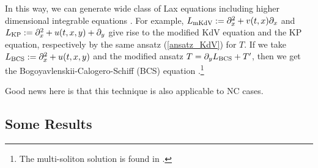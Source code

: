 \documentclass[a4paper,12pt]{article}\setlength{\topmargin}{-1cm}
\begin{document}
In this way, we can generate wide class of Lax equations 
including higher dimensional integrable equations \cite{ToYu}.
For example, $L_{\scriptsize\mbox{mKdV}}:=\partial_x^2+v(t,x)\partial_x$ and 
$L_{\scriptsize\mbox{KP}}:=\partial_x^2+u(t,x,y)+\partial_y$ give rise to 
the modified KdV equation and the KP equation, respectively 
by the same ansatz (\ref{ansatz_KdV}) for $T$.
If we take $L_{\scriptsize\mbox{BCS}}:=\partial_x^2+u(t,x,y)$ and 
the modified ansatz $T=\partial_y L_{\scriptsize\mbox{BCS}}+T^\prime$,
then we get the Bogoyavlenskii-Calogero-Schiff (BCS) 
equation \cite{BoSc}.\footnote{The multi-soliton solution 
is found in \cite{YTSF}.}

Good news here is that this technique is also applicable to
NC cases.

\subsection{Some Results}
\end{document}
